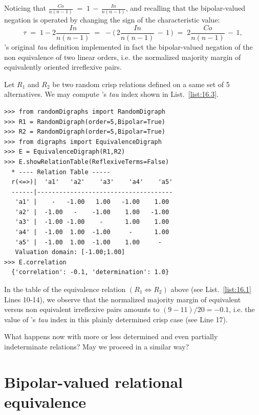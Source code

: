 Noticing that $\frac{Co}{n(n-1)} \;=\; 1 \,-\, \frac{In}{n(n-1)}$, and recalling that the bipolar-valued negation is operated by changing the sign of the characteristic value:
\begin{equation}
      \tau \;=\; 1 -2\frac{In}{n(n-1)} \;=\; -\big(\,2\frac{In}{n(n-1)} \,-\, 1\,\big) \;=\; 2\frac{Co}{n(n-1)} \,-\, 1,
\end{equation} 
\Kendall 's original \emph{tau} definition implemented in fact the bipolar-valued negation of the non equivalence of two linear orders, i.e. the normalized majority margin of equivalently oriented irreflexive pairs.

Let $R_1$ and $R_2$ be two random crisp relations defined on a same set of 5 alternatives. We may compute \Kendall 's \emph{tau} index shown in List.~\vref{list:16.3}.
\begin{lstlisting}[caption={Computing a relational equivalence digraph},label=list:16.3]
>>> from randomDigraphs import RandomDigraph
>>> R1 = RandomDigraph(order=5,Bipolar=True)
>>> R2 = RandomDigraph(order=5,Bipolar=True)
>>> from digraphs import EquivalenceDigraph
>>> E = EquivalenceDigraph(R1,R2)
>>> E.showRelationTable(ReflexiveTerms=False)
  * ---- Relation Table -----
  r(<=>)|  'a1'	  'a2'	  'a3'	  'a4'	  'a5'	  
  ------|-------------------------------------
   'a1' |    -   -1.00   1.00   -1.00    1.00	 
   'a2' |  -1.00   -    -1.00    1.00   -1.00	 
   'a3' |  -1.00 -1.00    -      1.00    1.00	 
   'a4' |  -1.00  1.00  -1.00     -      1.00	 
   'a5' |  -1.00  1.00  -1.00    1.00     - 	 
   Valuation domain: [-1.00;1.00]
>>> E.correlation
  {'correlation': -0.1, 'determination': 1.0}
\end{lstlisting}
In the table of the equivalence relation $(R_1 \Leftrightarrow R_2)$ above (see List.~\vref{list:16.1} Lines 10-14), we observe that the normalized majority margin of equivalent versus non equivalent irreflexive pairs amounts to $(9 - 11)/20 = -0.1$, i.e. the value of \Kendall 's \emph{tau} index in this plainly determined crisp case (see Line 17).

What happens now with more or less determined and even partially indeterminate relations? May we proceed in a similar way?

\section{Bipolar-valued relational equivalence}
\label{sec:17.2}

